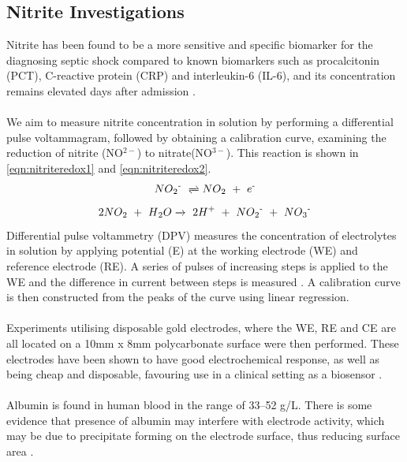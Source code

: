 \subsection{Nitrite Investigations}
Nitrite has been found to be a more sensitive and specific biomarker for the diagnosing septic shock compared  to known biomarkers such as procalcitonin (PCT), C-reactive protein (CRP) and interleukin-6 (IL-6), and its concentration remains elevated days after admission \cite{pmid9142024}.\\\\
We aim to measure nitrite concentration in solution by performing a differential pulse voltammagram, followed by obtaining a calibration curve, examining the reduction of nitrite (NO$^{2-}$) to nitrate(NO$^{3-}$). This reaction is shown in \autoref{eqn:nitriteredox1} and \autoref{eqn:nitriteredox2}.
\begin{align} \label{eqn:nitriteredox1}
   NO\textsubscript{2}\textsuperscript{-} \ \xrightleftharpoons{}  NO\textsubscript{2} \ + \  e\textsuperscript{-}
\end{align} 
\begin{align}\label{eqn:nitriteredox2}
  2NO\textsubscript{2} \ + \ H\textsubscript{2}O \xrightarrow{}\  2H\textsuperscript{+} \ + \ NO\textsubscript{2}\textsuperscript{-} \ + \  NO\textsubscript{3}\textsuperscript{-}
\end{align}
Differential pulse voltammetry (DPV) measures the concentration of electrolytes in solution by applying potential (E) at the working electrode (WE) and reference electrode (RE). A series of pulses of increasing steps is applied to the WE and the difference in current between steps is measured \cite{D1CP00661D}. A calibration curve is then constructed from the peaks of the curve using linear regression. \\\\
Experiments utilising disposable gold electrodes, where the WE, RE and CE are all located on a 10mm x 8mm polycarbonate surface were then performed. These electrodes have been shown to have good electrochemical response, as well as being cheap and disposable, favouring use in a clinical setting as a biosensor \cite{FERRARIO201236}.\\\\
Albumin is found in human blood in the range of 33–52 g/L. There is some evidence that presence of albumin may interfere with electrode activity, which may be due to precipitate forming on the electrode surface, thus reducing surface area \cite{doi:10.1177/000456329102800111}.
